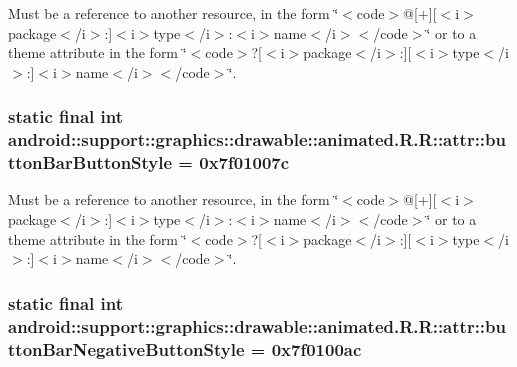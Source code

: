 Must be a reference to another resource, in the form \char`\"{}$<$code$>$@\mbox{[}+\mbox{]}\mbox{[}$<$i$>$package$<$/i$>$:\mbox{]}$<$i$>$type$<$/i$>$:$<$i$>$name$<$/i$>$$<$/code$>$\char`\"{} or to a theme attribute in the form \char`\"{}$<$code$>$?\mbox{[}$<$i$>$package$<$/i$>$:\mbox{]}\mbox{[}$<$i$>$type$<$/i$>$:\mbox{]}$<$i$>$name$<$/i$>$$<$/code$>$\char`\"{}. \hypertarget{classandroid_1_1support_1_1graphics_1_1drawable_1_1animated_1_1_r_1_1attr_7e30313906f05a82e0497e1549cf7a56}{
\subsubsection[{buttonBarButtonStyle}]{\setlength{\rightskip}{0pt plus 5cm}static final int android::support::graphics::drawable::animated.R.R::attr::buttonBarButtonStyle = 0x7f01007c}}
\label{classandroid_1_1support_1_1graphics_1_1drawable_1_1animated_1_1_r_1_1attr_7e30313906f05a82e0497e1549cf7a56}


Must be a reference to another resource, in the form \char`\"{}$<$code$>$@\mbox{[}+\mbox{]}\mbox{[}$<$i$>$package$<$/i$>$:\mbox{]}$<$i$>$type$<$/i$>$:$<$i$>$name$<$/i$>$$<$/code$>$\char`\"{} or to a theme attribute in the form \char`\"{}$<$code$>$?\mbox{[}$<$i$>$package$<$/i$>$:\mbox{]}\mbox{[}$<$i$>$type$<$/i$>$:\mbox{]}$<$i$>$name$<$/i$>$$<$/code$>$\char`\"{}. \hypertarget{classandroid_1_1support_1_1graphics_1_1drawable_1_1animated_1_1_r_1_1attr_0d9f5e0b384a3ffd249b2cdc32ade1e0}{
\subsubsection[{buttonBarNegativeButtonStyle}]{\setlength{\rightskip}{0pt plus 5cm}static final int android::support::graphics::drawable::animated.R.R::attr::buttonBarNegativeButtonStyle = 0x7f0100ac}}
\label{classandroid_1_1support_1_1graphics_1_1drawable_1_1animated_1_1_r_1_1attr_0d9f5e0b384a3ffd249b2cdc32ade1e0}


